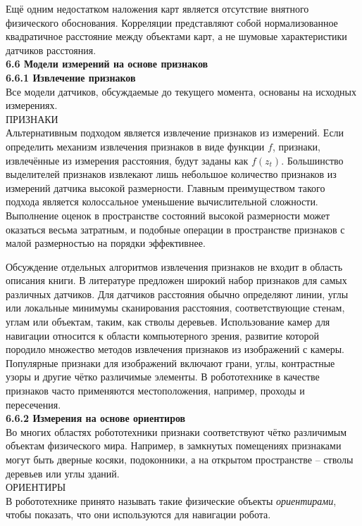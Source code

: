 \documentclass[10pt,a4paper]{article}
\begin{document}
Ещё одним недостатком наложения карт является отсутствие внятного физического обоснования. Корреляции представляют собой нормализованное квадратичное расстояние между объектами карт, а не шумовые характеристики датчиков расстояния.\\

\textbf{6.6 Модели измерений на основе признаков} \\

\textbf{6.6.1 Извлечение признаков}\\

Все модели датчиков, обсуждаемые до текущего момента, основаны на исходных измерениях.\\
ПРИЗНАКИ\\
Альтернативным подходом является извлечение признаков из измерений. 
Если определить механизм извлечения признаков в виде функции $f$, признаки, извлечённые из измерения расстояния, будут заданы как $f(z_t)$. Большинство выделителей признаков извлекают лишь небольшое количество признаков из измерений датчика высокой размерности. Главным преимуществом такого подхода является колоссальное уменьшение вычислительной сложности. Выполнение оценок в пространстве состояний высокой размерности может оказаться весьма затратным, и подобные операции в пространстве признаков с малой размерностью на порядки эффективнее. 

Обсуждение отдельных алгоритмов извлечения признаков не входит в область описания книги. В литературе предложен широкий набор признаков для самых различных датчиков. Для датчиков расстояния обычно определяют линии, углы или локальные минимумы сканирования расстояния, соответствующие стенам, углам или объектам, таким, как стволы деревьев. Использование камер для навигации относится к области компьютерного зрения, развитие которой породило множество методов извлечения признаков из изображений с камеры. Популярные признаки для изображений включают грани, углы, контрастные узоры и другие чётко различимые элементы. В робототехнике в качестве признаков часто применяются местоположения, например, проходы и пересечения.\\

\textbf{6.6.2 Измерения на основе ориентиров} \\

Во многих областях робототехники признаки соответствуют чётко различимым объектам физического мира. Например, в замкнутых помещениях признаками могут быть дверные косяки, подоконники, а на открытом пространстве – стволы деревьев или углы зданий.\\  
ОРИЕНТИРЫ \\
В робототехнике принято называть такие физические объекты \textit{ориентирами}, чтобы показать, что они используются для навигации робота.
\end{document}
